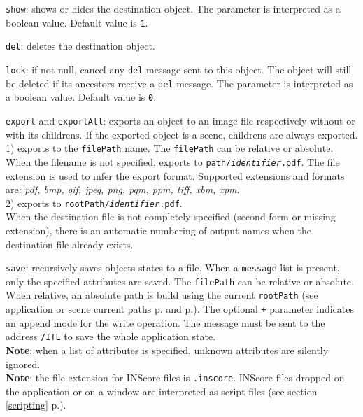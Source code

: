 \documentclass[a4paper,twoside]{report}
\newcommand{\fullref}[1]	{\ref{#1} p.\pageref{#1}}
\newcommand{\OSC}[1]		{\texttt{#1}}
\newcommand{\values}[1]		{\texttt{#1}}
\let\olditemize\itemize
\let\oldenditemize\enditemize
\renewenvironment{itemize} 	{\olditemize \setlength{\itemsep}{1mm}}{\oldenditemize}
\begin{document}
\begin{itemize}
\item \OSC{show}: shows or hides the destination object. The parameter is interpreted as a boolean value. Default value is \values{1}. 
\item \OSC{del}: deletes the destination object. 

\item \OSC{lock}: if not null, cancel any \OSC{del} message sent to this object. The object will still be deleted if its ancestors receive a \OSC{del} message. The parameter is interpreted as a boolean value. Default value is \values{0}. 

\item \OSC{export} and \OSC{exportAll}: exports an object to an image file respectively without or with its childrens. If the exported object is a scene, childrens are always exported.\\
1) exports to the \OSC{filePath} name. The \OSC{filePath} can be relative or absolute. When the filename is not specified, exports to \OSC{path/\textit{identifier}.pdf}. The file extension is used to infer the export format. Supported extensions and formats are: \emph{pdf, bmp, gif, jpeg, png, pgm, ppm, tiff, xbm, xpm}. \\
2) exports to \OSC{rootPath/\textit{identifier}.pdf}.\\
When the destination file is not completely specified (second form or missing extension), there is an automatic numbering of output names when the destination file already exists. \\ 

\item \OSC{save}: recursively saves objects states to a file. When a \OSC{message} list is present, only the specified attributes are saved. The \OSC{filePath} can be relative or absolute. When relative, an absolute path is build using the current \OSC{rootPath} (see application or scene current paths  p.\pageref{applmgmt} and  p.\pageref{scene}). The optional \OSC{+} parameter indicates an append mode for the write operation. The message must be sent to the address \OSC{/ITL} to save the whole application state.\\
\textbf{Note}: when a list of attributes is specified, unknown attributes are silently ignored. \\
\textbf{Note}: the file extension for INScore files is \OSC{.inscore}. INScore files dropped on the application or on a window are interpreted as script files (see section \fullref{scripting}).


\end{itemize}
\end{document}
